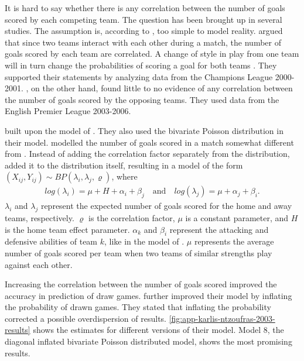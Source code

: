 It is hard to say whether there is any correlation between the number of goals scored by each competing team. The question has been brought up in several studies. The assumption is, according to \citet{bib:maher-1982}, too simple to model reality. \citet{bib:karlis-ntzoufras-2003} argued that since two teams interact with each other during a match, the number of goals scored by each team are correlated. A change of style in play from one team will in turn change the probabilities of scoring a goal for both teams \citep{bib:karlis-ntzoufras-2003}. They supported their statements by analyzing data from the Champions League 2000-2001. \citet{bib:mchale-scarf-2007}, on the other hand, found little to no evidence of any correlation between the number of goals scored by the opposing teams. They used data from the English Premier League 2003-2006.

\citet{bib:karlis-ntzoufras-2003} built upon the model of \citet{bib:maher-1982}. They also used the bivariate Poisson distribution in their model. \citet{bib:karlis-ntzoufras-2003} modelled the number of goals scored in a match somewhat different from \citet{bib:maher-1982}. Instead of adding the correlation factor separately from the distribution, \citet{bib:karlis-ntzoufras-2003} added it to the distribution itself, resulting in a model of the form $(X_{ij}, Y_{ij}) \sim BP(\lambda_{i}, \lambda_{j}, \varrho)$, where
\begin{equation}
    \begin{aligned}
        log(\lambda_{i}) = \mu + H + \alpha_{i} + \beta_{j}
        \quad \text{and} \quad
        log(\lambda_{j}) = \mu + \alpha_{j} + \beta_{i}.
    \end{aligned}
    \label{eq:karlis-ntzoufras-model}
\end{equation}
$\lambda_{i}$ and $\lambda_{j}$ represent the expected number of goals scored for the home and away teams, respectively. $\varrho$ is the correlation factor, $\mu$ is a constant parameter, and $H$ is the home team effect parameter. $\alpha_{k}$ and $\beta_{i}$ represent the attacking and defensive abilities of team $k$, like in the model of \citet{bib:maher-1982}. $\mu$ represents the average number of goals scored per team when two teams of similar strengths play against each other.

Increasing the correlation between the number of goals scored improved the accuracy in prediction of draw games. \citet{bib:karlis-ntzoufras-2003} further improved their model by inflating the probability of drawn games. They stated that inflating the probability corrected a possible overdispersion of results. \cref{fig:app-karlis-ntzoufras-2003-results} shows the estimates for different versions of their model. Model 8, the diagonal inflated bivariate Poisson distributed model, shows the most promising results.

